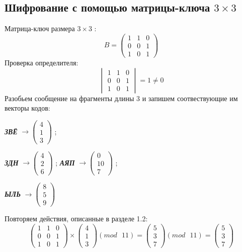 \documentclass[a5paper, 10pt]{article}
\theoremstyle{definition}
\theoremstyle{plain}
\theoremstyle{remark}
\begin{document}
\subsection{Шифрование с помощью матрицы-ключа $3 \times 3$}
Матрица-ключ размера  $3 \times 3$ :
\begin{equation}
B =
\begin{pmatrix}
1 & 1 & 0 \\
0 & 0 & 1\\
1 & 0 & 1
\end{pmatrix}
\end{equation}
Проверка определителя:
\begin{equation}
\begin{vmatrix}
1 & 1 & 0 \\
0 & 0 & 1\\
1 & 0 & 1
\end{vmatrix}
= 1 \neq 0
\end{equation}
Разобьем сообщение на фрагменты длины 3 и запишем соотвествующие им векторы кодов:
\begin{center}
\textbf{\textit{ЗВЁ}} $\to \begin{pmatrix}
 4\\
1\\
3
\end{pmatrix}$ ;

\textbf{\textit{ЗДН}}  $\to \begin{pmatrix}
4\\
 2\\
6
\end{pmatrix}$ ;
\textbf{\textit{АЯП}}  $\to \begin{pmatrix}
 0\\
10\\
7
\end{pmatrix}$ ;

\textbf{\textit{ЫЛЬ}}  $\to \begin{pmatrix}
8\\
 5\\
9
\end{pmatrix}$ \\
\end{center}
Повторяем действия, описанные в разделе 1.2:
\begin{equation}
\begin{pmatrix}
 1 & 1 & 0 \\
0 & 0 & 1\\
1 & 0 & 1
\end{pmatrix}
 \times
\begin{pmatrix}
 4\\
1\\
3
\end{pmatrix}
(mod \text{ }11)
= 
\begin{pmatrix}
 5\\
3\\
7
\end{pmatrix}
(mod \text{ }11)
= \begin{pmatrix}
5 \\
3\\
7
\end{pmatrix}
\end{equation}
\end{document}
